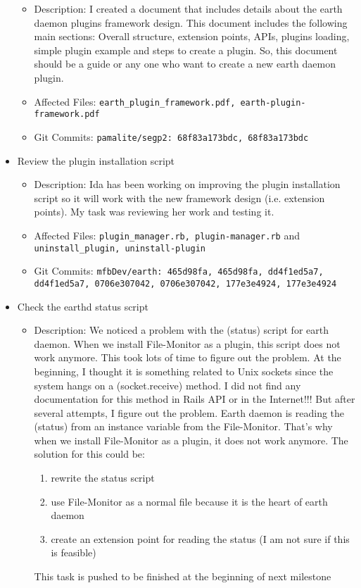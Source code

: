 \begin{itemize}
        \begin{itemize}
            \item Description: I created a document that includes details about the earth daemon plugins framework design. This document includes the following main sections: Overall structure, extension points, APIs, plugins loading, simple plugin example and steps to create a plugin. So, this document should be a guide or any one who want to create a new earth daemon plugin. 
            \item Affected Files: \texttt{earth\_plugin\_framework.pdf, earth-plugin-framework.pdf}
            \item Git Commits: \texttt{pamalite/segp2: 68f83a173bdc, 68f83a173bdc}
        \end{itemize}
    \item Review the plugin installation script 
        \begin{itemize}
            \item Description: Ida has been working on improving the plugin installation script so it will work with the new framework design (i.e. extension points). My task was reviewing her work and testing it. 
            \item Affected Files: \texttt{plugin\_manager.rb, plugin-manager.rb} and \texttt{uninstall\_plugin, uninstall-plugin}
            \item Git Commits: 
\texttt{mfbDev/earth: 465d98fa, 465d98fa, dd4f1ed5a7, dd4f1ed5a7, 0706e307042, 0706e307042, 177e3e4924, 177e3e4924} 
        \end{itemize}
    \item Check the earthd status script
        \begin{itemize}
            \item Description: We noticed a problem with the (status) script for earth daemon. When we install File-Monitor as a plugin, this script does not work anymore. This took lots of time to figure out the problem. At the beginning, I thought it is something related to Unix sockets since the system hangs on a (socket.receive) method. I did not find any documentation for this method in Rails API or in the Internet!!! But after several attempts, I figure out the problem. Earth daemon is reading the (status) from an instance variable from the File-Monitor. That's why when we install File-Monitor as a plugin, it does not work anymore. The solution for this could be: 
                \begin{enumerate}
                    \item rewrite the status script
                    \item use File-Monitor as a normal file because it is the heart of earth daemon
                    \item create an extension point for reading the status (I am not sure if this is feasible)
                \end{enumerate}
This task is pushed to be finished at the beginning of next milestone


\end{itemize}
\end{itemize}
